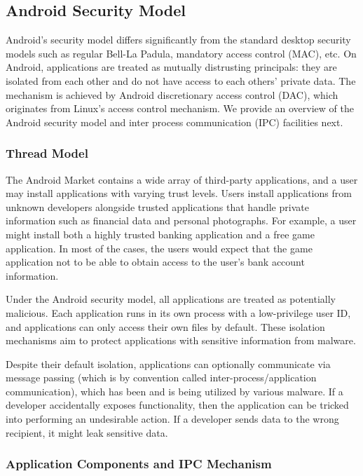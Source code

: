 \subsection{Android Security Model}
Android's security model differs significantly from the standard desktop security models such as regular Bell-La Padula, mandatory access control (MAC), etc. On Android, applications are treated as mutually distrusting principals: they are isolated from each other and do not have access to each others' private data. The mechanism is achieved by Android discretionary access control (DAC), which originates from Linux's access control mechanism. We provide an overview of the Android security model and inter process communication (IPC) facilities next.

\subsubsection{Thread Model}

The Android Market contains a wide array of third-party applications, and a user may install applications with varying trust levels. Users install applications from unknown developers alongside trusted applications that handle private information such as financial data and personal photographs. For example, a user might install both a highly trusted banking application and a free game application. In most of the cases, the users would expect that the game application not to be able to obtain access to the user's bank account information.

Under the Android security model, all applications are treated as potentially malicious. Each application runs in its own process with a low-privilege user ID, and applications can only access their own files by default. These isolation mechanisms aim to protect applications with sensitive information from malware.

Despite their default isolation, applications can optionally communicate via message passing (which is by convention called inter-process/application communication), which has been and is being utilized by various malware. If a developer accidentally exposes functionality, then the application can be tricked into performing an undesirable action. If a developer sends data to the wrong recipient, it might leak sensitive data.

\subsubsection{Application Components and IPC Mechanism}

